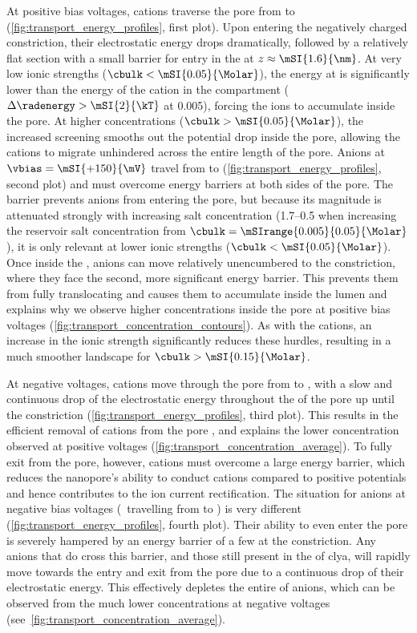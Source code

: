 At positive bias voltages, cations traverse the pore from \transi{} to \cisi{}
(\cref{fig:transport_energy_profiles}, first plot). Upon entering the negatively charged constriction, their
electrostatic energy drops dramatically, followed by a relatively flat section with a small barrier for entry
in the \lumen{} at $z \approx \mSI{1.6}{\nm}$. At very low ionic strengths ($\cbulk < \mSI{0.05}{\Molar}$),
the energy at \transi{} is significantly lower than the energy of the cation in the \cisi{} compartment
(\eg~$\Delta\radenergy > \mSI{2}{\kT}$ at \SI{0.005}{\Molar}), forcing the ions to accumulate inside the pore.
At higher concentrations ($\cbulk > \mSI{0.05}{\Molar}$), the increased screening smooths out the potential
drop inside the pore, allowing the cations to migrate unhindered across the entire length of the pore. Anions
at $\vbias = \mSI{+150}{\mV}$ travel from \cisi{} to \transi{} (\cref{fig:transport_energy_profiles}, second
plot) and must overcome energy barriers at both sides of the pore. The \cisi{} barrier prevents anions from
entering the pore, but because its magnitude is attenuated strongly with increasing salt concentration
(\SIrange{1.7}{0.5}{\kT} when increasing the reservoir salt concentration from $\cbulk =
\mSIrange{0.005}{0.05}{\Molar}$), it is only relevant at lower ionic strengths ($\cbulk <
\mSI{0.05}{\Molar}$). Once inside the \lumen{}, anions can move relatively unencumbered to the \transi{}
constriction, where they face the second, more significant energy barrier. This prevents them from fully
translocating and causes them to accumulate inside the lumen and explains why we observe higher \Cl{}
concentrations inside the pore at positive bias voltages (\cref{fig:transport_concentration_contours}). As
with the cations, an increase in the ionic strength significantly reduces these hurdles, resulting in a much
smoother landscape for $\cbulk > \mSI{0.15}{\Molar}$.

At negative voltages, cations move through the pore from \cisi{} to \transi{}, with a slow and continuous drop
of the electrostatic energy throughout the \lumen{} of the pore up until the constriction
(\cref{fig:transport_energy_profiles}, third plot). This results in the efficient removal of cations from the
pore \lumen{}, and explains the lower \Na{} concentration observed at positive voltages
(\cref{fig:transport_concentration_average}). To fully exit from the pore, however, cations must overcome a
large energy barrier, which reduces the nanopore's ability to conduct cations compared to positive potentials
and hence contributes to the ion current rectification. The situation for anions at negative bias voltages
(\ie~travelling from \transi{} to \cisi{}) is very different (\cref{fig:transport_energy_profiles}, fourth
plot). Their ability to even enter the pore is severely hampered by an energy barrier of a few \si{\kT} at the
\transi{} constriction. Any anions that do cross this barrier, and those still present in the \lumen{} of
\gls{clya}, will rapidly move towards the \cisi{} entry and exit from the pore due to a continuous drop of
their electrostatic energy. This effectively depletes the entire \lumen{} of anions, which can be observed
from the much lower \Cl{} concentrations at negative voltages
(see~\cref{fig:transport_concentration_average}).

